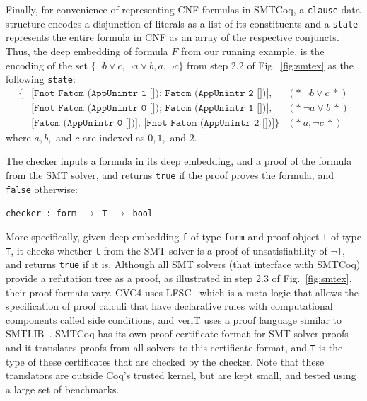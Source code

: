 \documentclass{article}
\begin{document}
	Finally, for convenience of representing 
	CNF formulas in SMTCoq, a \texttt{clause} 
	data structure encodes a disjunction of 
	literals as a list of its constituents 
	and a \texttt{state} represents the entire 
	formula in CNF as an array of the 
	respective conjuncts. Thus, the deep 
	embedding of formula $F$ from our running 
	example, is the encoding of the set 
	$\{\neg b \lor c, \neg a \lor b, a, 
	\neg c\}$ from step 2.2 of 
	Fig.~\ref{fig:smtex} 
	as the following \texttt{state}:
	\begin{align*}
	\{&\texttt{[Fnot Fatom (AppUnintr 1 []); 
		Fatom (AppUnintr 2 [])],} &(*\ \neg b \lor c\ *)\\
	&\texttt{[Fnot Fatom (AppUnintr 0 []);
		Fatom (AppUnintr 1 [])],} &(*\ \neg a \lor b\ *)\\
	&\texttt{[Fatom (AppUnintr 0 [])],
		[Fnot Fatom (AppUnintr 2 [])]}\} &(*\ a, \neg c\ *)  
	\end{align*}
	where $a, b,$ and $c$ are indexed as 
	$0, 1,$ and $2$.
	
	The checker inputs a formula in its 
	deep embedding, and a proof of the 
	formula from the SMT solver, and 
	returns \texttt{true} if the proof 
	proves the formula, and 
	\texttt{false} otherwise:
	\begin{center}
		\texttt{checker : form 
			$\to$ T $\to$ bool}	
	\end{center}
	More specifically, given deep embedding 
	\texttt{f} of type \texttt{form}
	and proof object \texttt{t} of type 
	\texttt{T}, it checks whether \texttt{t} 
	from the SMT solver is a proof of  
	unsatisfiability of	\texttt{$\neg$f}, and 
	returns \texttt{true} if it is. 
	Although all SMT solvers (that 
	interface with SMTCoq) provide a
	refutation tree as a proof, as 
	illustrated in step 2.3 of 
	Fig.~\ref{fig:smtex},
	their proof formats vary. CVC4 uses 
	LFSC~\cite{DBLP:journals/fmsd/StumpORHT13}
	which is a meta-logic that allows the 
	specification of proof calculi that have 
	declarative	rules with computational 
	components called side conditions, and 
	veriT uses a proof language similar to 
	SMTLIB~\cite{Besson1}. SMTCoq has its 
	own proof certificate format for SMT 
	solver proofs and it translates proofs 
	from all solvers to this certificate 
	format, and \texttt{T} is the type of 
	these certificates that are 
	checked by the checker. Note 
	that these translators are outside 
	Coq's trusted kernel, but are kept
	small, and tested using a large 
	set of benchmarks. 
	
\end{document}

